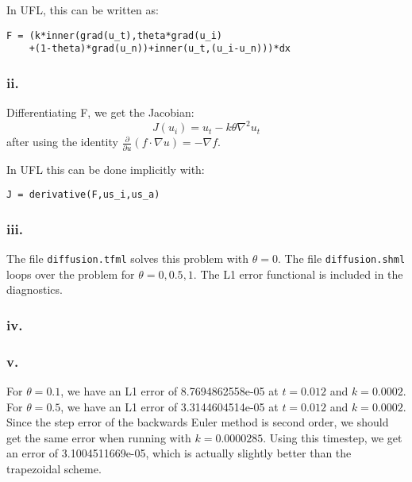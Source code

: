 \documentclass{article}
\begin{document}
In UFL, this can be written as:
\begin{verbatim}
F = (k*inner(grad(u_t),theta*grad(u_i)
    +(1-theta)*grad(u_n))+inner(u_t,(u_i-u_n)))*dx
\end{verbatim}

\subsubsection*{ii.}
Differentiating F, we get the Jacobian:
\begin{equation}
J(u_i)=u_t-k\theta\nabla^2u_t
\end{equation}
after using the identity $\frac{\partial}{\partial u}(f\cdot\nabla u)=-\nabla f$.

In UFL this can be done implicitly with:
\begin{verbatim}
J = derivative(F,us_i,us_a)
\end{verbatim}

\subsubsection*{iii.}
The file \verb|diffusion.tfml| solves this problem with $\theta=0$. The file \verb|diffusion.shml| loops over the problem for $\theta=0,0.5,1$. The L1 error functional is included in the diagnostics.

\subsubsection*{iv.}

\subsubsection*{v.}
For $\theta=0.1$, we have an L1 error of 8.7694862558e-05 at $t=0.012$ and $k=0.0002$. For $\theta=0.5$, we have an L1 error of 3.3144604514e-05 at $t=0.012$ and $k=0.0002$. Since the step error of the backwards Euler method is second order, we should get the same error when running with $k=0.0000285$. Using this timestep, we get an error of 3.1004511669e-05, which is actually slightly better than the trapezoidal scheme.
\end{document}
